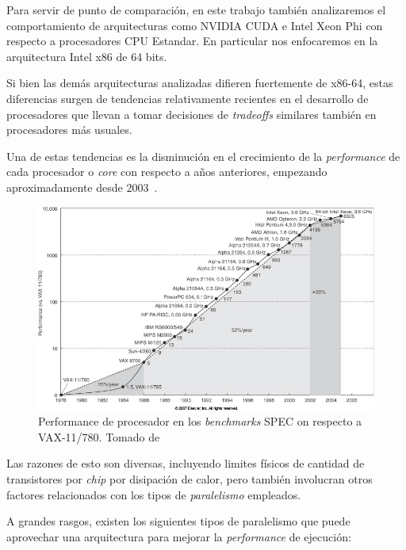 Para servir de punto de comparaci\'on, en este trabajo tambi\'en analizaremos el 
comportamiento de arquitecturas como NVIDIA CUDA e Intel Xeon Phi con respecto a procesadores
CPU Estandar. En particular nos enfocaremos en la arquitectura Intel x86 de 64 bits.

Si bien las dem\'as arquitecturas analizadas difieren fuertemente de x86-64, estas diferencias
surgen de tendencias relativamente recientes en el desarrollo de procesadores que llevan a
tomar decisiones de \textit{tradeoffs} similares tambi\'en en procesadores m\'as usuales.

Una de estas tendencias es la disminuci\'on en el crecimiento de la \textit{performance} de
cada procesador o \textit{core} con respecto a a\~nos anteriores, empezando aproximadamente
desde 2003~\cite{HennessyPatterson}.

\begin{figure}[htbp]
    \centering
    \includegraphics[width=\textwidth]{images/processor-performance.jpg}
    \caption{Performance de procesador en los \textit{benchmarks} SPEC on respecto a VAX-11/780. Tomado de~\cite{HennessyPatterson}}
    \label{processor_performance}
\end{figure}

Las razones de esto son diversas, incluyendo limites f\'isicos de cantidad de transistores
por \textit{chip} por disipaci\'on de calor, pero tambi\'en involucran otros factores 
relacionados con los tipos de \textit{paralelismo} empleados.

A grandes rasgos, existen los siguientes tipos de paralelismo que puede aprovechar una
arquitectura para mejorar la \textit{performance} de ejecuci\'on:

